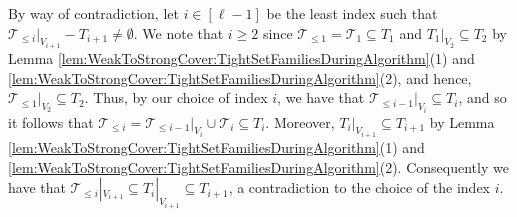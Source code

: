 \documentclass{article}
\newcommand{\zeros}{\ensuremath{\mathcal{Z}}\xspace}
\newcommand{\maximalTightSetFamily}[1]{\ensuremath{\calT_{#1}}\xspace}
\newcommand{\tightSetFamily}[1]{\ensuremath{T_{#1}}\xspace}
\newcommand{\cumulativeMaximalTightSetFamily}[1]{\ensuremath{\calT_{\leq #1}}}
\newcommand{\tightSetFamilyAfterReduce}[1]{\ensuremath{T_{#1}^R}\xspace}
\newcommand{\projTightSetFamilyAfterReduce}[2]{\ensuremath{T_{#1}^R|_{V_{#2}}}\xspace}
\providecommand{\calT}{\mathcal{T}}
\begin{document}
        \item By way of contradiction, let $i \in [\ell - 1]$ be the least index such that $\cumulativeMaximalTightSetFamily{i}|_{V_{i+1}} - T_{i+1} \not = \emptyset$. We note that $i \geq 2$ since $\cumulativeMaximalTightSetFamily{1} = \maximalTightSetFamily{1}\subseteq T_1$ and $T_1|_{V_2}\subseteq T_2$ by Lemma  \ref{lem:WeakToStrongCover:TightSetFamiliesDuringAlgorithm}(1) and \ref{lem:WeakToStrongCover:TightSetFamiliesDuringAlgorithm}(2), and hence, $\cumulativeMaximalTightSetFamily{1}|_{V_2}\subseteq T_2$. Thus, by our choice of index $i$, we have that $\cumulativeMaximalTightSetFamily{i-1}|_{V_i} \subseteq \tightSetFamily{i}$, and so it follows that $\cumulativeMaximalTightSetFamily{i} = \cumulativeMaximalTightSetFamily{i-1}|_{V_i} \cup \maximalTightSetFamily{i} \subseteq \tightSetFamily{i}$. Moreover, $T_i|_{V_{i+1}}\subseteq T_{i+1}$ by Lemma  \ref{lem:WeakToStrongCover:TightSetFamiliesDuringAlgorithm}(1) and \ref{lem:WeakToStrongCover:TightSetFamiliesDuringAlgorithm}(2). Consequently we have that $\cumulativeMaximalTightSetFamily{i}|_{V_{i+1}} \subseteq \tightSetFamily{i}|_{V_{i+1}} \subseteq \tightSetFamily{i+1}$, a contradiction to the choice of the index $i$. 
\end{document}
